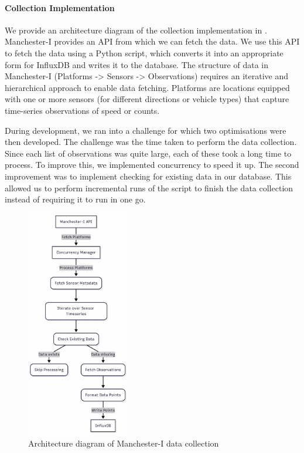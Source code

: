 \paragraph{Collection Implementation}
We provide an architecture diagram of the collection implementation in . Manchester-I provides an API from which we can fetch the data. We use this API to fetch the data using a Python script, which converts it into an appropriate form for InfluxDB and writes it to the database. The structure of data in Manchester-I (Platforms -> Sensors -> Observations) requires an iterative and hierarchical approach to enable data fetching. Platforms are locations equipped with one or more sensors (for different directions or vehicle types) that capture time-series observations of speed or counts.

During development, we ran into a challenge for which two optimisations were then developed. The challenge was the time taken to perform the data collection. Since each list of observations was quite large, each of these took a long time to process. To improve this, we implemented concurrency to speed it up. The second improvement was to implement checking for existing data in our database. This allowed us to perform incremental runs of the script to finish the data collection instead of requiring it to run in one go.

\begin{figure}[!ht]
  \centering
  \includegraphics[width=0.4\textwidth]{images/design-implementation/manchester-i.pdf}
  \caption{Architecture diagram of Manchester-I data collection}
  \label{fig:Manchester-i}
\end{figure}

